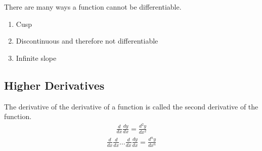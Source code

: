 \documentclass{article}
\theoremstyle{mytheoremstyle}
\theoremstyle{mytheoremstyle}
\theoremstyle{myproblemstyle}
\begin{document}
    There are many ways a function cannot be differentiable.
    \begin{enumerate}
        \item Cusp \\

        \item Discontinuous and therefore not differentiable \\

        \item Infinite slope \\
    \end{enumerate}

    \subsection*{Higher Derivatives}
    The derivative of the derivative of a function is called the second
    derivative of the function.
    \begin{align*}
        \frac{d}{dx} \frac{dy}{dx} = \frac{d^2y}{dx^2}
    \end{align*}
    \begin{align*}
        \frac{d}{dx} \frac{d}{dx} \dots \frac{d}{dx} \frac{dy}{dx}
        = \frac{d^ny}{dx^n}
    \end{align*}
\end{document}
